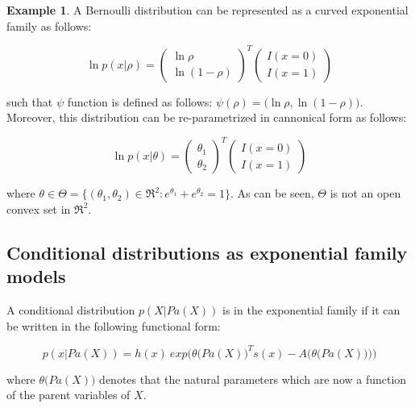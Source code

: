 \documentclass[11pt, oneside]{article}   	%
\newcommand{\bm}{\mathbf}
\numberwithin{figure}{section}
\numberwithin{equation}{section}
\numberwithin{table}{section}
\theoremstyle{definition}
\newtheorem{exmp}{Example}[section]
\begin{document}
\begin{exmp}

A Bernoulli distribution can be represented as a curved exponential family as follows: 

$$
\ln p(x| \rho ) = 
\begin{pmatrix}
\ln \rho\\
\ln (1-\rho)
\end{pmatrix}^T
\begin{pmatrix}
I(x=0)\\
I(x=1)
\end{pmatrix}
$$

\noindent such that $\psi$ function is defined as follows: $\psi(\rho) = \big(\ln \rho, \ln (1-\rho) \big)$. Moreover, this distribution can be re-parametrized in cannonical form as follows: 

$$
\ln p(x| \theta ) = 
\begin{pmatrix}
\theta_1\\
\theta_2
\end{pmatrix}^T
\begin{pmatrix}
I(x=0)\\
I(x=1)
\end{pmatrix}
$$

\noindent where $\theta\in\Theta = \{ (\theta_1, \theta_2) \in \Re^2 : e^{\theta_1} + e^{\theta_2} = 1\}$.  As can be seen, $\Theta$ is not an open convex set in $\Re^2$. 

\end{exmp}

\subsection*{Conditional distributions as exponential family models} \label{sec:CondDist}

A conditional distribution $p(X|Pa(X))$ is in the exponential family if it can be written in the following functional form:

\begin{equation}
p(x | Pa(X)) = h(x)~exp \Big( \theta \big(Pa(X) \big)^Ts(x) - A \big(\theta  \big(Pa(X)  \big) \big) \Big) 
\end{equation}

\noindent where $\theta  \big(Pa(X) \big)$ denotes that the natural parameters which are now a function of the parent variables of $X$.  %
\end{document}
